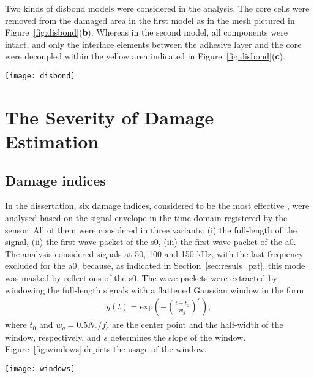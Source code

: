 \documentclass[a4paper,fleqn]{cas-dc}
\begin{document}
Two kinds of disbond models were considered in the analysis.
The core cells were removed from the damaged area in the first model as in the mesh pictured in Figure~\ref{fig:disbond}(\textbf{b}).
Whereas in the second model, all components were intact, and only the interface elements between the adhesive layer and the core were decoupled within the yellow area indicated in Figure~\ref{fig:disbond}(\textbf{c}).
\begin{figure*}[!bh]
	\begin{center}
		\texttt{[image: disbond]}
	\end{center}
	\caption{The damaged area in the: (\textbf{a}) experimental sample,(\textbf{b}) numerical model with removed cells and (\textbf{c}) numerical model with interface decoupling}
	\label{fig:disbond}
\end{figure*}

\section{The Severity of Damage Estimation}
\subsection{Damage indices}
\label{sec:di}

In the dissertation, six damage indices, considered to be the most effective \cite{torkamani2014novel, moix2016damage}, were analysed based on the signal envelope in the time-domain registered by the sensor.
All of them were considered in three variants: (i) the full-length of the signal, (ii) the first wave packet of the \ac{s0}, (iii) the first wave packet of the \ac{a0}.
The analysis considered signals at 50, 100 and 150 \unit{\kHz}, with the last frequency excluded for the \ac{a0}, because, as indicated in Section~\ref{sec:resuls_pzt}, this mode was masked by reflections of the \ac{s0}.
The wave packets were extracted by windowing the full-length signals with a flattened Gaussian window in the form
\begin{eqnarray}
	g(t)= \mathrm{exp}\left(-\left(\frac{t-t_0}{w_g}\right) ^{s}\right),
	\label{eq:psi_g}
\end{eqnarray}
where \(t_0\) and \(w_g=0.5N_c/f_c\) are the center point and the half-width of the window, respectively, and \(s\) determines the slope of the window. Figure~\ref{fig:windows} depicts the usage of the window.
\begin{figure*}[!tbh]
	\begin{center}
		\texttt{[image: windows]}
	\end{center}
	\caption{The signal envelop and the Gaussian windows}
	\label{fig:windows}
\end{figure*}
\end{document}

